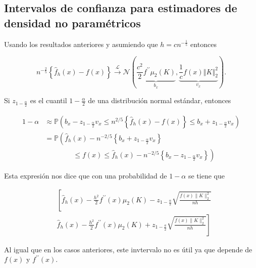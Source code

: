 \documentclass[
  12pt,
]{book}
\theoremstyle{definition}
\theoremstyle{definition}
\theoremstyle{definition}
\theoremstyle{remark}
\begin{document}
\hypertarget{intervalos-de-confianza-para-estimadores-de-densidad-no-paramuxe9tricos}{%
\subsection{Intervalos de confianza para estimadores de densidad no paramétricos}\label{intervalos-de-confianza-para-estimadores-de-densidad-no-paramuxe9tricos}}

Usando los resultados anteriores y asumiendo que \(h=cn^{-\frac{1}{5}}\) entonces

\begin{equation*}
n^{-\frac{2}{5}} \left\{ \hat{f}_{h}(x) -f(x)\right\}
\xrightarrow{\mathcal{L}} \mathcal{N}\left(\underbrace{\frac{c^{2}}{2} f^{\prime\prime}
\mu_{2}(K)}_{b_{x}}, \underbrace{\frac{1}{c}f(x) \left\Vert K \right\Vert_{2}^{2}}_{v_{x}}\right).
\end{equation*}

Si \(z_{1-\frac{\alpha}{2}}\) es el cuantil \(1-\frac{\alpha}{2}\) de una distribución normal estándar, entonces

\begin{align*}
1-\alpha
& \approx \mathbb{P}\left(b_{x}-z_{1-\frac{\alpha}{2}} v_{x} \leq n^{2 / 5}\left\{\widehat{f}_{h}(x)-f(x)\right\} \leq b_{x}+z_{1-\frac{\alpha}{2}} v_{x}\right) \\
& =\mathbb{P}\left(\widehat{f}_{h}(x)-n^{-2 / 5}\left\{b_{x}+z_{1-\frac{\alpha}{2}} v_{x}\right\}\right.                                                         \\
& \qquad\qquad \left. \leq f(x)\leq \hat{f}_{h}(x)-n^{-2 / 5}\left\{b_{x}-z_{1-\frac{\alpha}{2}} v_{x}\right\}\right)
\end{align*}

Esta expresión nos dice que con una probabilidad de \(1-\alpha\) se tiene que

\begin{equation*}
\begin{aligned}
& \left[\hat{f}_{h}(x)-\frac{h^{2}}{2} f^{\prime \prime}(x) \mu_{2}(K)-z_{1-\frac{\alpha}{2}} \sqrt{\frac{f(x)\|K\|_{2}^{2}}{n h}}\right. \\
& \left.\widehat{f}_{h}(x)-\frac{h^{2}}{2} f^{\prime \prime}(x) \mu_{2}(K)+z_{1-\frac{a}{2}} \sqrt{\frac{f(x)\|K\|_{2}^{2}}{n h}}\right]
\end{aligned}
\end{equation*}

Al igual que en los casos anteriores, este invtervalo no es útil ya que depende de \(f(x)\) y \(f^{\prime\prime} (x)\).
\end{document}
